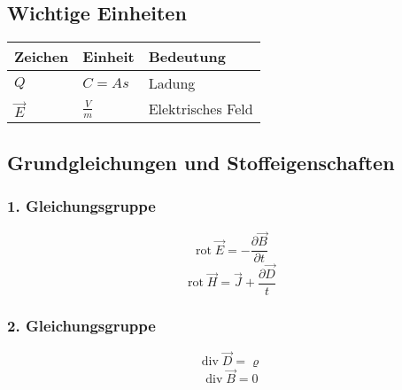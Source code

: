 \documentclass[12pt,a4paper]{report}%
\DeclareMathOperator{\diverg}{div}
\DeclareMathOperator{\rot}{rot}
\numberwithin{equation}{section}
\numberwithin{equation}{section}
\begin{document}
		\subsection{Wichtige Einheiten}
		\renewcommand{\arraystretch}{1.5}
	\begin{longtable} {|p{2cm}|p{3cm}|p{8.4cm}|} \hline
	\textbf{Zeichen} & \textbf{Einheit} & \textbf{Bedeutung} \\
	\hline
	\endfirsthead %
	\endfoot
	
	$Q$ & $C = As$ & Ladung \\ \hline
	$\vec{E}$ & $\frac{V}{m}$ & Elektrisches Feld \\ \hline
	\end{longtable}
	\renewcommand{\arraystretch}{1}
		\subsection{Grundgleichungen und Stoffeigenschaften}
			\subsubsection{1. Gleichungsgruppe}
			\begin{equation}
				\rot{\vec{E}} = - \frac{\partial \vec{B}}{\partial t} \label{eq:mx_rot_e}
			\end{equation}
			\begin{equation}
				\rot \vec{H} = \vec{J}+\frac{\partial \vec{D}}{t} \label{eq:mx_rot_h}
			\end{equation}
			
			\subsubsection{2. Gleichungsgruppe}
			\begin{equation}
				\diverg \vec{D} = \varrho \label{eq:mx_div_d}
			\end{equation}
			\begin{equation}
				\diverg \vec{B} = 0 \label{eq:mx_div_b}
			\end{equation}
			
\end{document}
